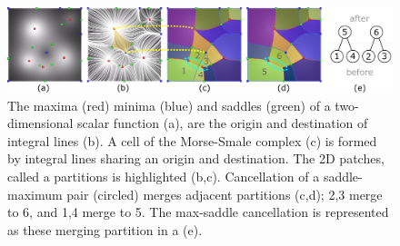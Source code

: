 


\begin{figure}[tb]
    \begin{center}
    \includegraphics[width=0.99\linewidth]{2020-regulus/figs/msc/mscoveriew2.pdf}
    \vspace{-0.15in}
    \caption{The maxima (red) minima (blue) and saddles (green) of a two-dimensional scalar function (a), are the origin and destination of integral lines (b). A cell of the Morse-Smale complex (c) is formed by integral lines sharing an origin and destination. The 2D patches, called a partitions is highlighted (b,c). Cancellation of a saddle-maximum pair (circled) merges adjacent partitions (c,d); 2,3 merge to 6, and 1,4 merge to 5. The max-saddle cancellation is represented as these merging partition in a \RT (e). }
    \label{fig:msc-overview}
    \end{center}
    \vspace{-.1in}
\end{figure}



